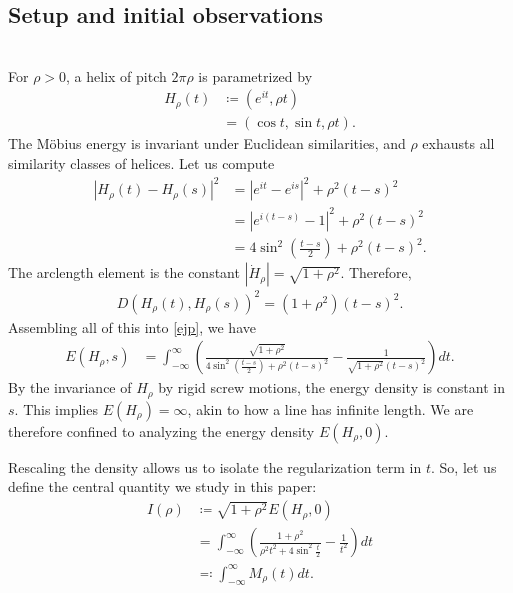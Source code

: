 \documentclass{amsart}
\theoremstyle{plain}
\numberwithin{theorem}{section}
\theoremstyle{definition}
\theoremstyle{remark}
\theoremstyle{brakets}
\begin{document}
\subsection{Setup and initial observations}
~\\
For $\rho > 0$, a helix of pitch $2\pi\rho$ is parametrized by 
\begin{align*}
    H_\rho(t) &\coloneq (e^{it},\rho t) \\
    &= (\cos t, \sin t, \rho t).
\end{align*}
The M\"obius energy is invariant under Euclidean similarities, and $\rho$ exhausts all similarity classes of helices. Let us compute
\begin{align*}
    \left| H_\rho(t) - H_\rho(s) \right|^2 &= \left|e^{it} - e^{is}\right|^2 + \rho^2(t-s)^2 \\
    &= \left| e^{i(t-s)} - 1 \right|^2 + \rho^2(t-s)^2\\
    &= 4\sin^2\left( \frac{t-s}{2} \right) + \rho^2(t-s)^2.
\end{align*}
The arclength element is the constant $|\dot{H}_\rho| = \sqrt{1 + \rho^2}$. Therefore,
\begin{align*}
    D(H_\rho(t),H_\rho(s))^2 = (1 + \rho^2)(t-s)^2.
\end{align*}
Assembling all of this into \eqref{ejp}, we have
\begin{align*}
    E(H_\rho,s) &= \int_{-\infty}^\infty \left(\frac{\sqrt{1 + \rho^2}}{4\sin^2\left( \frac{t-s}{2} \right) + \rho^2(t-s)^2} - \frac{1}{\sqrt{1+\rho^2}(t-s)^2} \right)dt. 
\end{align*}
 By the invariance of $H_\rho$ by rigid screw motions, the energy density is constant in $s$. This implies $E(H_\rho) = \infty$, akin to how a line has infinite length. We are therefore confined to analyzing the energy density $E(H_\rho, 0)$.
 
 Rescaling the density allows us to isolate the regularization term in $t$. So, let us define the central quantity we study in this paper:
 \begin{align}
 \label{mrho}
     I(\rho) &\coloneq \sqrt{1 + \rho^2}E(H_\rho,0) \nonumber \\
     &= \int_{-\infty}^\infty \left( \frac{1 + \rho^2}{\rho^2 t^2 + 4\sin^2 \frac{t}{2}} - \frac{1}{t^2}\right)dt \nonumber \\
     &\eqqcolon \int_{-\infty}^{\infty} M_\rho(t) dt.
 \end{align}
\end{document}
